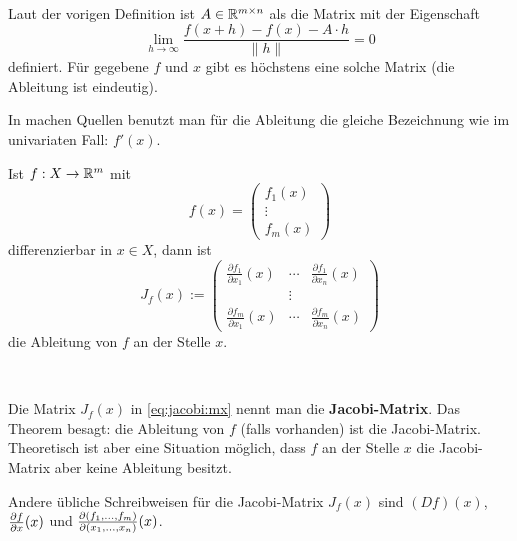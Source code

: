 \begin{bem} { \ } 
	\begin{enuma} 
		\item Laut der vorigen Definition ist $A \in \mathbb{R}^{m \times n}$ als die Matrix mit der Eigenschaft 
		\[
			\lim_{h \to \infty} \frac{ f(x+ h) - f(x) - A \cdot h}{\| h\|} = 0
		\]
		definiert. Für gegebene $f$ und $x$ gibt es höchstens eine solche Matrix (die Ableitung ist eindeutig).
	\item In machen Quellen benutzt man für die Ableitung die gleiche Bezeichnung wie im univariaten Fall: $f'(x)$. 
	\end{enuma} 
\end{bem} 


\begin{thm} \label{thm:abl:dim:n:m}
	Ist $f : X \to \mathbb{R}^m$  mit 
	\[
		f(x) = \begin{pmatrix} f_1(x) \\ \vdots \\ f_m(x) \end{pmatrix}
	\]
	differenzierbar in $x \in X$, dann ist
	\begin{equation} \label{eq:jacobi:mx}
		J_f(x) := \begin{pmatrix} \frac{\partial f_1}{\partial x_1} (x) & \cdots & \frac{\partial f_1}{\partial x_n} (x) 
	\\ & \vdots & 
	\\ \frac{\partial f_m}{\partial x_1} (x) & \cdots & \frac{\partial f_m}{\partial x_n} (x)
	\end{pmatrix} 
	\end{equation}
	die Ableitung von $f$ an der Stelle $x$. 
\end{thm} 


\begin{bem} {\ } 
	\begin{enuma} 
		\item Die Matrix $J_f(x)$ in \eqref{eq:jacobi:mx} nennt man die \textbf{Jacobi-Matrix}. Das Theorem besagt: die Ableitung von $f$ (falls vorhanden) ist die Jacobi-Matrix. Theoretisch ist aber eine Situation möglich, dass $f$ an der Stelle $x$ die Jacobi-Matrix aber keine Ableitung besitzt. 
		\item Andere übliche Schreibweisen für die Jacobi-Matrix $J_f(x)$ sind $(D f)(x)$, $\frac{\partial f}{\partial x} (x)$ und $\frac{\partial (f_1,\ldots,f_m)}{\partial (x_1,\ldots,x_n)} (x)$. 
	\end{enuma} 
\end{bem} 


